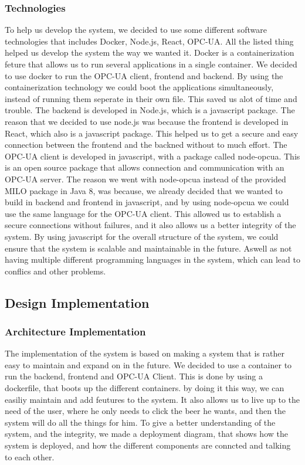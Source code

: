 \subsubsection{Technologies}
To help us develop the system, we decided to use some different software technologies that includes Docker, Node.js, React, OPC-UA. All the listed thing helped us develop the system the way we wanted it.
Docker is a containerization feture that allows us to run several applications in a single container. We decided to use docker to run the OPC-UA client, frontend and backend. By using the containerization technology we could boot the applications simultaneously, instead of running them seperate in their own file. This saved us alot of time and trouble.\newline
The backend is developed in Node.js, which is a javascript package. The reason that we decided to use node.js was because the frontend is developed in React, which also is a javascript package. This helped us to get a secure and easy connection between the frontend and the backned without to much effort. The OPC-UA client is developed in javascript, with a package called node-opcua. This is an open source package that allows connection and communication with an OPC-UA server. \newline
The reason we went with node-opcua instead of the provided MILO package in Java 8, was because, we already decided that we wanted to build in backend and frontend in javascript, and by using node-opcua we could use the same language for the OPC-UA client. This allowed us to establish a secure connections without failures, and it also allows us a better integrity of the system. 
By using javascript for the overall structure of the system, we could ensure that the system is scalable and maintainable in the future. Aswell as not having multiple different programming languages in the system, which can lead to conflics and other problems. \newline

\subsection{Design Implementation}

\subsubsection{Architecture Implementation}
The implementation of the system is based on making a system that is rather easy to maintain and expand on in the future. We decided to use a container to run the backend, frontend and OPC-UA Client. This is done by using a dockerfile, that boots up the different containers.
by doing it this way, we can easiliy maintain and add feutures to the system. It also allows us to live up to the need of the user, where he only needs to click the beer he wants, and then the system will do all the things for him. \newline
To give a better understanding of the system, and the integrity, we made a deployment diagram, that shows how the system is deployed, and how the different components are conncted and talking to each other. \newline

